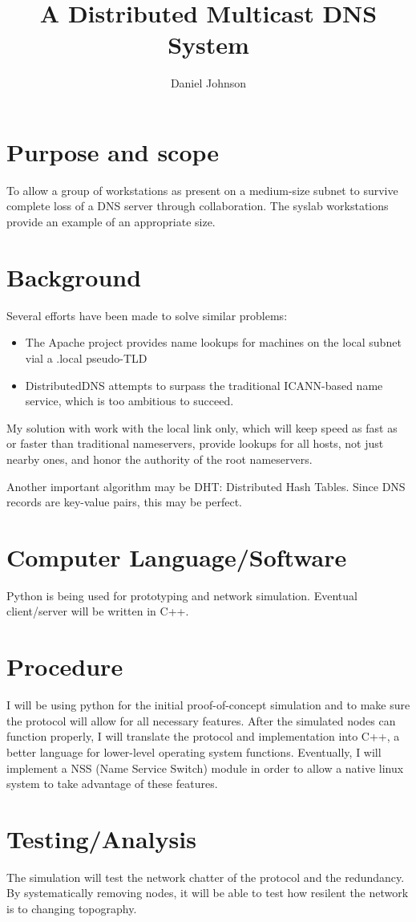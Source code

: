 \documentclass[12pt,letterpaper]{article}
\begin{document}
\author{Daniel Johnson}
\title{A Distributed Multicast DNS System}
\maketitle
\section{Purpose and scope}
To allow a group of workstations as present on a medium-size subnet to survive complete loss of a DNS server through collaboration. The syslab workstations provide an example of an appropriate size.
\section{Background}
Several efforts have been made to solve similar problems:
\begin{itemize}
\item The Apache project provides name lookups for machines on the local subnet vial a .local pseudo-TLD
\item DistributedDNS attempts to surpass the traditional ICANN-based name service, which is too ambitious to succeed.
\end{itemize}
My solution with work with the local link only, which will keep speed as fast as or faster than traditional nameservers, provide lookups for all hosts, not just nearby ones, and honor the authority of the root nameservers.

Another important algorithm may be DHT: Distributed Hash Tables. Since DNS records are key-value pairs, this may be perfect.
\section{Computer Language/Software}
Python is being used for prototyping and network simulation. Eventual client/server will be written in C++.
\section{Procedure}
I will be using python for the initial proof-of-concept simulation and to make sure the protocol will allow for all necessary features. After the simulated nodes can function properly, I will translate the protocol and implementation into C++, a better language for lower-level operating system functions. Eventually, I will implement a NSS (Name Service Switch) module in order to allow a native linux system to take advantage of these features.
\section{Testing/Analysis}
The simulation will test the network chatter of the protocol and the redundancy. By systematically removing nodes, it will be able to test how resilent the network is to changing topography.
\end{document}
